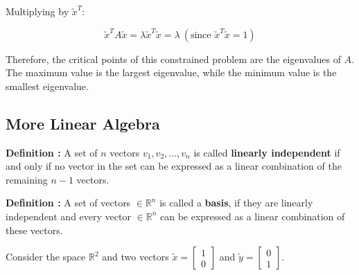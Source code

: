 \documentclass[11pt, a4paper]{article}
\begin{document}
Multiplying by $\utilde{x}^T$:

\[
\utilde{x}^T A \utilde{x} = \lambda \utilde{x}^T \utilde{x} = \lambda \ (\text{since } \utilde{x}^T \utilde{x} = 1)
\]

Therefore, the critical points of this constrained problem are the eigenvalues of $A$. \\[1.5em]

The maximum value is the largest eigenvalue, while the minimum value is the smallest eigenvalue.

\newpage

\subsection{More Linear Algebra}

\leftpointright \hspace{0.3cm} \textbf{Definition : } A set of $n$ vectors $v_1, v_2, \ldots , v_n$ is called \textbf{linearly independent} 
if and only if no vector in the set can be expressed as a linear combination of the remaining $n - 1$ vectors. \\

\vspace{0.3cm}

\leftpointright \hspace{0.3cm} \textbf{Definition : } A set of vectors $\in \mathbb{R}^n$ is called a \textbf{basis}, if they are linearly independent and every vector $\in \mathbb{R}^n$ can be expressed as a linear combination of these vectors. \\

\vspace{0.3cm}

\leftpointright \hspace{0.3cm} Consider the space $\mathbb{R}^2$ and two vectors $\utilde{x} =  \begin{bmatrix} 1 \\ 0 \end{bmatrix} $ and $\utilde{y} =  \begin{bmatrix} 0 \\ 1 \end{bmatrix} $.
\end{document}

